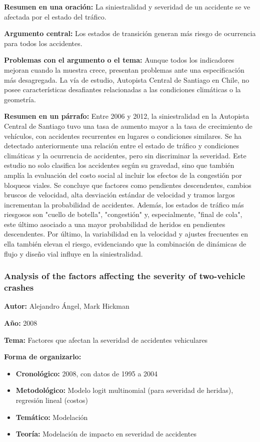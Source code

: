 \documentclass{book}
\begin{document}
\textbf{Resumen en una oración:} La siniestralidad y severidad de un accidente se ve afectada por el estado del tráfico.

\textbf{Argumento central:} Los estados de transición generan más riesgo de ocurrencia para todos los accidentes.

\textbf{Problemas con el argumento o el tema:} Aunque todos los indicadores mejoran cuando la muestra crece, presentan problemas ante una especificación más desagregada. La vía de estudio, Autopista Central de Santiago en Chile, no posee características desafiantes relacionadas a las condiciones climáticas o la geometría.

\textbf{Resumen en un párrafo:} Entre 2006 y 2012, la siniestralidad en la Autopista Central de Santiago tuvo una  tasa de aumento mayor a la tasa de crecimiento de vehículos, con accidentes recurrentes en lugares o condiciones similares. Se ha detectado anteriormente una relación entre el estado de tráfico y condiciones climáticas y la ocurrencia de accidentes, pero sin discriminar la severidad. Este estudio no solo clasifica los accidentes según su gravedad, sino que también amplía la evaluación del costo social al incluir los efectos de la congestión por bloqueos viales. Se concluye que factores como pendientes descendentes, cambios bruscos de velocidad, alta desviación estándar de velocidad y tramos largos incrementan la probabilidad de accidentes. Además, los estados de tráfico más riesgosos son "cuello de botella", "congestión" y, especialmente, "final de cola", este último asociado a una mayor probabilidad de heridos en pendientes descendentes. Por último, la variabilidad en la velocidad y ajustes frecuentes en ella también elevan el riesgo, evidenciando que la combinación de dinámicas de flujo y diseño vial influye en la siniestralidad.

\subsubsection{Analysis of the factors affecting the severity of two-vehicle crashes}
\textbf{Autor:} Alejandro Ángel, Mark Hickman

\textbf{Año:} 2008

\textbf{Tema:} Factores que afectan la severidad de accidentes vehiculares

\textbf{Forma de organizarlo:}

\begin{itemize}
\setlength{\itemindent}{0.5in}
    \item \textbf{Cronológico:} 2008, con datos de 1995 a 2004
    \item \textbf{Metodológico:} Modelo logit multinomial (para severidad de heridas), regresión lineal (costos)
    \item \textbf{Temático:} Modelación
    \item \textbf{Teoría:} Modelación de impacto en severidad de accidentes
\end{itemize}
\end{document}
